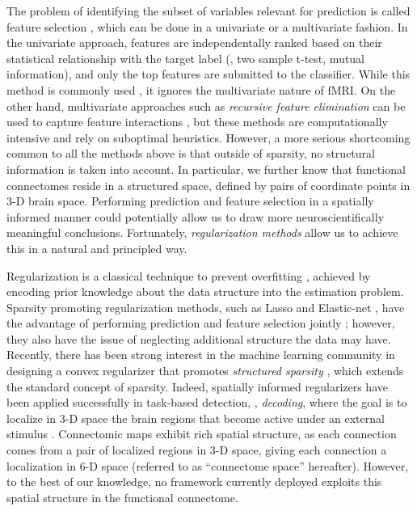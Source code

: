 The problem of identifying the subset of variables relevant for prediction is called feature selection \citep{Jain:2000, Guyon:2003}, which can be done in a univariate or a multivariate fashion.
In the univariate approach, features are independentally ranked based on their statistical relationship with the target label (\eg, two sample t-test, mutual information), and only the top features are submitted to the classifier.
While this method is commonly used \citep{Zeng:2012, Sripada:2013}, it ignores the multivariate nature of fMRI.
On the other hand, multivariate approaches such as \emph{recursive feature elimination} \citep{Guyon:2003} can be used to capture feature interactions \citep{Craddock:2009,Dai:2012}, but these methods are computationally intensive and rely on suboptimal heuristics.
However, a more serious shortcoming common to all the methods above is that outside of sparsity, no structural information is taken into account.
In particular, we further know that functional connectomes reside in a structured space, defined by pairs of coordinate points in $3$-D brain space.
Performing prediction and feature selection in a spatially informed manner could potentially allow us to draw more neuroscientifically meaningful conclusions.
Fortunately, \emph{regularization methods} allow us to achieve this in a natural and principled way.

Regularization is a classical technique to prevent overfitting \citep{Tikhonov:1963,Stein:1961}, achieved by encoding prior knowledge about the data structure into the estimation problem.
Sparsity promoting regularization methods, such as Lasso \citep{Tibshirani:1996} and Elastic-net \citep{Zou:2005}, have the advantage of performing prediction and feature selection jointly \citep{Grosenick:2008, Yamashita:2008}; however, they also have the issue of neglecting additional structure the data may have.  Recently, there has been strong interest in the machine learning community in designing a convex regularizer that promotes \emph{structured sparsity} \citep{Mairal:2011,Chen:2012,Micchelli:2013}, which extends the standard concept of sparsity. 
Indeed, spatially informed regularizers have been applied successfully in task-based detection, \ie, \emph{decoding}, where the goal is to localize in $3$-D space the brain regions that become active under an external stimulus \citep{Baldassarre:2012,Michel:2011,Jenatton:2012,Grosenick:2013, Gramfort:2013}. 
Connectomic maps exhibit rich spatial structure, as each connection comes from a pair of localized regions in $3$-D space, giving each connection a localization in $6$-D space (referred to as ``connectome space'' hereafter).
However, to the best of our knowledge, no framework currently deployed exploits this spatial structure in the functional connectome. 

